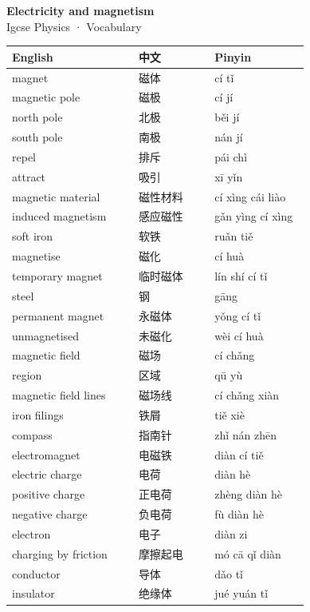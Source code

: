 \documentclass[11pt]{article}
\begin{document}
\begin{center}
  {\LARGE\bfseries Electricity and magnetism}\\[0.35em]
  {\large Igcse Physics · Vocabulary}
\end{center}
\vspace{0.6em}

\begin{longtable}{@{}p{0.40\linewidth}p{0.24\linewidth}p{0.30\linewidth}@{}}
\toprule
\textbf{English} & \textbf{中文} & \textbf{Pinyin} \\
\midrule
\endhead
\bottomrule
\endlastfoot
magnet & 磁体 & cí tǐ \\
magnetic pole & 磁极 & cí jí \\
north pole & 北极 & běi jí \\
south pole & 南极 & nán jí \\
repel & 排斥 & pái chì \\
attract & 吸引 & xī yǐn \\
magnetic material & 磁性材料 & cí xìng cái liào \\
induced magnetism & 感应磁性 & gǎn yìng cí xìng \\
soft iron & 软铁 & ruǎn tiě \\
magnetise & 磁化 & cí huà \\
temporary magnet & 临时磁体 & lín shí cí tǐ \\
steel & 钢 & gāng \\
permanent magnet & 永磁体 & yǒng cí tǐ \\
unmagnetised & 未磁化 & wèi cí huà \\
magnetic field & 磁场 & cí chǎng \\
region & 区域 & qū yù \\
magnetic field lines & 磁场线 & cí chǎng xiàn \\
iron filings & 铁屑 & tiě xiè \\
compass & 指南针 & zhǐ nán zhēn \\
electromagnet & 电磁铁 & diàn cí tiě \\
electric charge & 电荷 & diàn hè \\
positive charge & 正电荷 & zhèng diàn hè \\
negative charge & 负电荷 & fù diàn hè \\
electron & 电子 & diàn zi \\
charging by friction & 摩擦起电 & mó cā qǐ diàn \\
conductor & 导体 & dǎo tǐ \\
insulator & 绝缘体 & jué yuán tǐ \\

\end{longtable}
\end{document}
